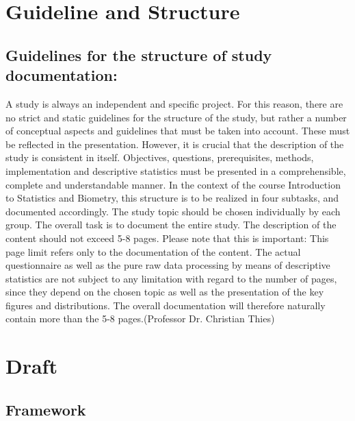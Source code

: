 
\newcommand{\englishQuote}[1]{“\textit{#1}”}


\label{chap:questions}


\chapter{Guideline and Structure}
\section{Guidelines for the structure of study documentation: }

A study is always an independent and specific project. For this reason, there are no strict
and static guidelines for the structure of the study, but rather a number of conceptual
aspects and guidelines that must be taken into account. These must be reflected in the
presentation. However, it is crucial that the description of the study is consistent in itself.
Objectives, questions, prerequisites, methods, implementation and descriptive statistics
must be presented in a comprehensible, complete and understandable manner.
In the context of the course Introduction to Statistics and Biometry, this structure is to be
realized in four subtasks, and documented accordingly. The study topic should be chosen
individually by each group.
The overall task is to document the entire study. The description of the content should
not exceed 5-8 pages. Please note that this is important: This page limit refers only to
the documentation of the content. The actual questionnaire as well as the pure raw data
processing by means of descriptive statistics are not subject to any limitation with
regard to the number of pages, since they depend on the chosen topic as well as the
presentation of the key figures and distributions. The overall documentation will
therefore naturally contain more than the 5-8 pages.(Professor Dr. Christian Thies)

\pagebreak
\chapter{Draft}
\section{Framework}

